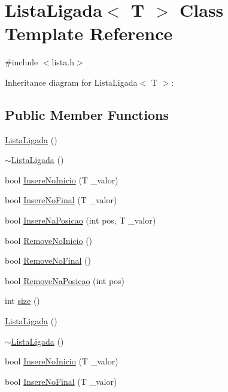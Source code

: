 \hypertarget{classListaLigada}{\section{Lista\-Ligada$<$ T $>$ Class Template Reference}
\label{classListaLigada}
}


{\ttfamily \#include $<$lista.\-h$>$}



Inheritance diagram for Lista\-Ligada$<$ T $>$\-:
\subsection*{Public Member Functions}
\begin{DoxyCompactItemize}
\item 
\hyperlink{classListaLigada_aceed3c08dcb208b4622b317c5cef104b}{Lista\-Ligada} ()
\item 
\hyperlink{classListaLigada_a2e171a163616642932b7db0c19aa5b49}{$\sim$\-Lista\-Ligada} ()
\item 
bool \hyperlink{classListaLigada_ae5c528807334f89f5fa34beab6cccebf}{Insere\-No\-Inicio} (T \-\_\-valor)
\item 
bool \hyperlink{classListaLigada_a0a7a7ca52d16deda399c51e9c32aa167}{Insere\-No\-Final} (T \-\_\-valor)
\item 
bool \hyperlink{classListaLigada_ae42913bdf31cb66ab4a0eec0e207e843}{Insere\-Na\-Posicao} (int pos, T \-\_\-valor)
\item 
bool \hyperlink{classListaLigada_a96e263fe9ff0385719a67680d2d9eadc}{Remove\-No\-Inicio} ()
\item 
bool \hyperlink{classListaLigada_a48a1b9c8e883f6db2e0d68cfd18e0793}{Remove\-No\-Final} ()
\item 
bool \hyperlink{classListaLigada_a5e47ccba3363b97c6223d8867f18bbf7}{Remove\-Na\-Posicao} (int pos)
\item 
int \hyperlink{classListaLigada_aaa0fe8d3ea92daa521f97d5aa1936ae6}{size} ()
\item 
\hyperlink{classListaLigada_aceed3c08dcb208b4622b317c5cef104b}{Lista\-Ligada} ()
\item 
\hyperlink{classListaLigada_a2e171a163616642932b7db0c19aa5b49}{$\sim$\-Lista\-Ligada} ()
\item 
bool \hyperlink{classListaLigada_ae5c528807334f89f5fa34beab6cccebf}{Insere\-No\-Inicio} (T \-\_\-valor)
\item 
bool \hyperlink{classListaLigada_a0a7a7ca52d16deda399c51e9c32aa167}{Insere\-No\-Final} (T \-\_\-valor)

\end{DoxyCompactItemize}
